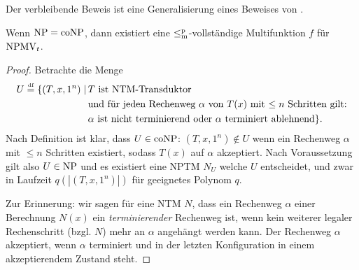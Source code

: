Der verbleibende Beweis ist eine Generalisierung eines Beweises von \textcite{dingel_separation_2022}.
\begin{theorem}\label{thm:npmvt-vs-npconp}
    Wenn $\mathrm{NP}=\mathrm{coNP}$, dann existiert eine $\leq_\mathrm{m}^\mathrm{p}$-vollständige Multifunktion $f$ für $\mathrm{NPMV}_t$.
\end{theorem}
\begin{proof}
    Betrachte die Menge
\[ \begin{split} U \stackrel{\text{{\normalfont\tiny df}}}{=}  \{ (T, x, 1^n) \mid \,&\text{$T$ ist NTM-Transduktor} \\ &\text{und für jeden Rechenweg $\alpha$ von $T(x)$ mit $\leq n$ Schritten gilt:} \\& \text{$\alpha$ ist nicht terminierend oder $\alpha$ terminiert ablehnend} \}. \end{split}  \]
    Nach Definition ist klar, dass $U\in\mathrm{coNP}$: $(T, x, 1^n)\not\in U$ wenn ein Rechenweg $\alpha$ mit $\leq n$ Schritten existiert, sodass $T(x)$ auf $\alpha$ akzeptiert. Nach Voraussetzung gilt also $U\in\mathrm{NP}$ und es existiert eine NPTM $N_U$ welche $U$ entscheidet, und zwar in Laufzeit $q(|(T, x, 1^n)|)$ für geeignetes Polynom $q$.

    Zur Erinnerung: wir sagen für eine NTM $N$, dass ein Rechenweg $\alpha$ einer Berechnung $N(x)$ ein \emph{terminierender} Rechenweg ist, wenn kein weiterer legaler Rechenschritt (bzgl. $N$) mehr an $\alpha$ angehängt werden kann. Der Rechenweg $\alpha$ akzeptiert, wenn $\alpha$ terminiert und in der letzten Konfiguration in einem akzeptierendem Zustand steht.


\end{proof}
